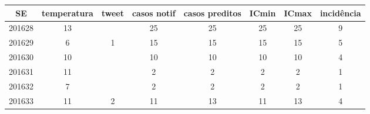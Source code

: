 \begin{tabular}{c|ccccccc}
  \hline
SE & temperatura & tweet & casos notif & casos preditos & ICmin & ICmax & incidência \\ 
  \hline
201628 & 13 &  & 25 & 25 & 25 & 25 & 9 \\ 
  201629 & 6 & 1 & 15 & 15 & 15 & 15 & 5 \\ 
  201630 & 10 &  & 10 & 10 & 10 & 10 & 4 \\ 
  201631 & 11 &  & 2 & 2 & 2 & 2 & 1 \\ 
  201632 & 7 &  & 2 & 2 & 2 & 2 & 1 \\ 
  201633 & 11 & 2 & 11 & 13 & 11 & 13 & 4 \\ 
   \hline
\end{tabular}
